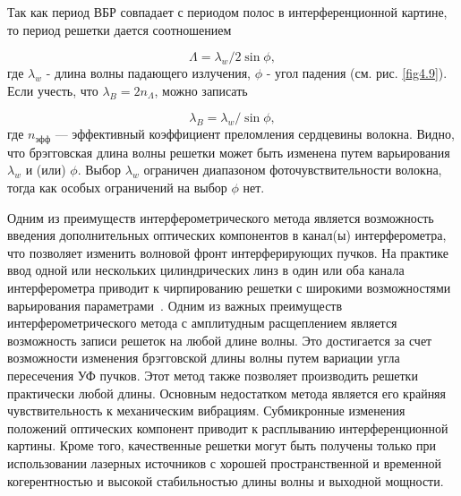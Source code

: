 Так как период ВБР совпадает с периодом полос в интерференционной картине, то период решетки дается соотношением

\begin{equation}\label{eq4.5}
\Lambda =\lambda_w /2\sin \phi,
\end{equation}
где $\lambda_w$ - длина волны падающего излучения, $\phi$ - угол падения (см. рис. \ref{fig4.9}). Если учесть, что $ \lambda_B =2n_\Lambda$, можно записать

\begin{equation}\label{eq4.6}
\lambda_B = \lambda_w /\sin\phi,
\end{equation}
где $n_{\text{эфф}}$ --- эффективный коэффициент преломления сердцевины волокна. Видно, что брэгговская длина волны решетки может быть изменена путем варьирования $\lambda_w$ и (или) $\phi$. Выбор $\lambda_w$ ограничен диапазоном фоточувствительности волокна, тогда как особых ограничений на выбор $\phi$ нет.

Одним из преимуществ интерферометрического метода является возможность введения дополнительных оптических компонентов в канал(ы) интерферометра, что позволяет изменить волновой фронт интерферирующих пучков. На практике ввод одной или нескольких цилиндрических линз в один или оба канала интерферометра приводит к чирпированию решетки с широкими возможностями варьирования параметрами~\cite{Bennion96}. Одним из важных преимуществ интерферометрического метода с амплитудным расщеплением является возможность записи решеток на любой длине волны. Это достигается за счет возможности изменения брэгговской длины волны путем вариации угла пересечения УФ пучков. Этот метод также позволяет производить решетки практически любой длины. Основным недостатком метода является его крайняя чувствительность к механическим вибрациям. Субмикронные изменения положений оптических компонент приводит к расплыванию интерференционной картины. Кроме того, качественные решетки могут быть получены только при использовании лазерных источников с хорошей пространственной и временной когерентностью и высокой стабильностью длины волны и выходной мощности.

